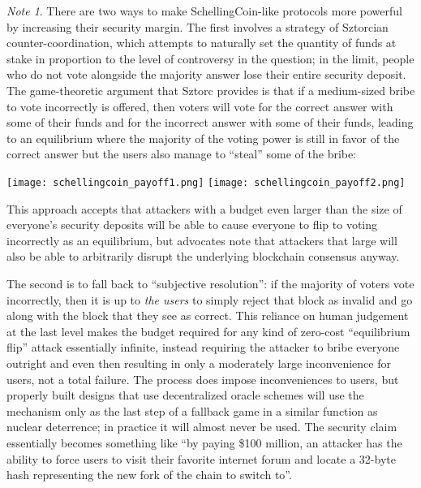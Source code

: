 \documentclass[11pt,a4paper]{article}
\theoremstyle{plain}
\theoremstyle{definition}
\theoremstyle{remark}
\newtheorem*{note}{Note}
\begin{document}
\begin{note}
There are two ways to make SchellingCoin-like protocols more powerful by increasing their security margin. The first involves a strategy of Sztorcian counter-coordination\cite{sztorc}, which attempts to naturally set the quantity of funds at stake in proportion to the level of controversy in the question; in the limit, people who do not vote alongside the majority answer lose their entire security deposit. The game-theoretic argument that Sztorc provides\cite{szcorc2} is that if a medium-sized bribe to vote incorrectly is offered, then voters will vote for the correct answer with some of their funds and for the incorrect answer with some of their funds, leading to an equilibrium where the majority of the voting power is still in favor of the correct answer but the users also manage to ``steal'' some of the bribe:

\begin{center}
\texttt{[image: schellingcoin\_payoff1.png]}
\texttt{[image: schellingcoin\_payoff2.png]}
\end{center}

This approach accepts that attackers with a budget even larger than the size of everyone's security deposits will be able to cause everyone to flip to voting incorrectly as an equilibrium, but advocates note that attackers that large will also be able to arbitrarily disrupt the underlying blockchain consensus anyway.

The second is to fall back to ``subjective resolution'': if the majority of voters vote incorrectly, then it is up to \emph{the users} to simply reject that block as invalid and go along with the block that they see as correct. This reliance on human judgement at the last level makes the budget required for any kind of zero-cost ``equilibrium flip'' attack essentially infinite, instead requiring the attacker to bribe everyone outright and even then resulting in only a moderately large inconvenience for users, not a total failure. The process does impose inconveniences to users, but properly built designs that use decentralized oracle schemes will use the mechanism only as the last step of a fallback game in a similar function as nuclear deterrence; in practice it will almost never be used. The security claim essentially becomes something like ``by paying \$100 million, an attacker has the ability to force users to visit their favorite internet forum and locate a 32-byte hash representing the new fork of the chain to switch to''.
\end{note}
\end{document}
